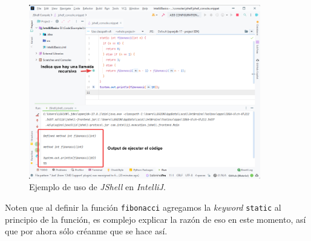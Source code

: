     \begin{figure}[ht!]
      \centering
      \includegraphics[width=0.9\textwidth]{img/Por_algo_se_empieza/idea64_jshell_fibonacci.png}
      \caption{Ejemplo de uso de \textit{JShell} en \textit{IntelliJ}.}
      \label{fig:idea64-jshell-fibonacci}
    \end{figure}

    Noten que al definir la función \texttt{fibonacci} agregamos la \textit{keyword}
    \texttt{static} al principio de la función, es complejo explicar la razón de eso en este
    momento, así que por ahora sólo créanme que se hace así.

